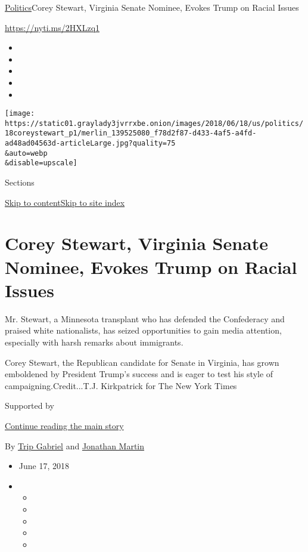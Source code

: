 \href{/section/politics}{Politics}\textbar{}Corey Stewart, Virginia
Senate Nominee, Evokes Trump on Racial Issues

\url{https://nyti.ms/2HXLzq1}

\begin{itemize}
\item
\item
\item
\item
\item
\end{itemize}

\texttt{[image: https://static01.graylady3jvrrxbe.onion/images/2018/06/18/us/politics/18coreystewart\_p1/merlin\_139525080\_f78d2f87-d433-4af5-a4fd-ad48ad04563d-articleLarge.jpg?quality=75\\\&auto=webp\\\&disable=upscale]}

Sections

\protect\hyperlink{site-content}{Skip to
content}\protect\hyperlink{site-index}{Skip to site index}

\hypertarget{corey-stewart-virginia-senate-nominee-evokes-trump-on-racial-issues}{%
\section{Corey Stewart, Virginia Senate Nominee, Evokes Trump on Racial
Issues}\label{corey-stewart-virginia-senate-nominee-evokes-trump-on-racial-issues}}

Mr. Stewart, a Minnesota transplant who has defended the Confederacy and
praised white nationalists, has seized opportunities to gain media
attention, especially with harsh remarks about immigrants.

Corey Stewart, the Republican candidate for Senate in Virginia, has
grown emboldened by President Trump's success and is eager to test his
style of campaigning.Credit...T.J. Kirkpatrick for The New York Times

Supported by

\protect\hyperlink{after-sponsor}{Continue reading the main story}

By \href{https://www.nytimes3xbfgragh.onion/by/trip-gabriel}{Trip
Gabriel} and
\href{https://www.nytimes3xbfgragh.onion/by/jonathan-martin}{Jonathan
Martin}

\begin{itemize}
\item
  June 17, 2018
\item
  \begin{itemize}
  \item
  \item
  \item
  \item
  \item
  \end{itemize}
\end{itemize}

